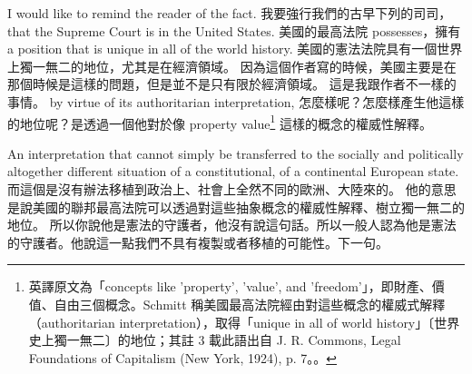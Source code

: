 \hypertarget{w05:cue:261}{}I would like to remind the reader of the fact.
\hypertarget{w05:cue:262}{}我要強行我們的古早下列的司司，that the Supreme Court is in the United States.
\hypertarget{w05:cue:263}{}美國的最高法院 possesses，擁有 a position that is unique in all of the world history.
\hypertarget{w05:cue:264}{}美國的憲法法院具有一個世界上獨一無二的地位，尤其是在經濟領域。
\hypertarget{w05:cue:265}{}因為這個作者寫的時候，美國主要是在那個時候是這樣的問題，但是並不是只有限於經濟領域。
\hypertarget{w05:cue:266}{}這是我跟作者不一樣的事情。 by virtue of its authoritarian interpretation,
\hypertarget{w05:cue:267}{}怎麼樣呢？怎麼樣產生他這樣的地位呢？是透過一個他對於像 property value\footnote{英譯原文為「concepts like 'property', 'value', and 'freedom'」，即財產、價值、自由三個概念。Schmitt 稱美國最高法院經由對這些概念的權威式解釋（authoritarian interpretation），取得「unique in all of world history」〔世界史上獨一無二〕的地位；其註 3 載此語出自 J. R. Commons, Legal Foundations of Capitalism (New York, 1924), p. 7。\cite[80]{schmitt2015}。} 這樣的概念的權威性解釋。

\hypertarget{w05:cue:268}{}An interpretation that cannot simply be transferred to the socially and politically altogether different situation of a constitutional, of a continental European state.
\hypertarget{w05:cue:269}{}而這個是沒有辦法移植到政治上、社會上全然不同的歐洲、大陸來的。
\hypertarget{w05:cue:270}{}他的意思是說美國的聯邦最高法院可以透過對這些抽象概念的權威性解釋、樹立獨一無二的地位。
\hypertarget{w05:cue:271}{}所以你說他是憲法的守護者，他沒有說這句話。所以一般人認為他是憲法的守護者。他說這一點我們不具有複製或者移植的可能性。下一句。

